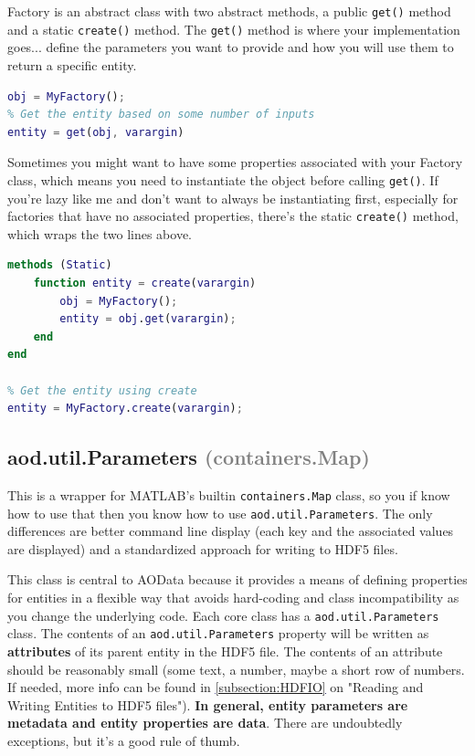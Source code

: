 \documentclass[10pt]{exam}
\newcommand\myurl[1]{\textcolor{blue}{\underline{#1}}}
\newcommand\myparent[1]{\textcolor{gray}{(#1)}}
\newcommand\aodclass[1]{\textcolor{codeblue}{\texttt{#1}}}
\newcommand\aodfcn[1]{\textcolor{darkteal}{\texttt{#1}}}
\begin{document}
		Factory is an abstract class with two abstract methods, a public \aodfcn{get()} method and a static \aodfcn{create()} method. The \aodfcn{get()} method is where your implementation goes... define the parameters you want to provide and how you will use them to return a specific entity. 
		\begin{lstlisting}[language=matlab]
% Instantiate the object
obj = MyFactory();
% Get the entity based on some number of inputs
entity = get(obj, varargin)
		\end{lstlisting}
		Sometimes you might want to have some properties associated with your Factory class, which means you need to instantiate the object before calling \aodfcn{get()}. If you're lazy like me and don't want to always be instantiating first, especially for factories that have no associated properties, there's the static \aodfcn{create()} method, which wraps the two lines above.
		\begin{lstlisting}[language=matlab]
methods (Static)
	function entity = create(varargin)
		obj = MyFactory();
		entity = obj.get(varargin);
	end
end

% Get the entity using create
entity = MyFactory.create(varargin);
		\end{lstlisting}
		
	\subsection{aod.util.Parameters \myparent{containers.Map}}
		\noindent  This is a wrapper for MATLAB's builtin \aodclass{containers.Map} class, so you if know how to use that then you know how to use \aodclass{aod.util.Parameters}. The only differences are better command line display (each key and the associated values are displayed) and a standardized approach for writing to HDF5 files. 
		
		This class is central to AOData because it provides a means of defining properties for entities in a flexible way that avoids hard-coding and class incompatibility as you change the underlying code. 
		Each core class has a \aodclass{aod.util.Parameters} class. The contents of an \aodclass{aod.util.Parameters} property will be written as \textbf{attributes} of its parent entity in the HDF5 file. The contents of an attribute should be reasonably small (some text, a number, maybe a short row of numbers. If needed, more info can be found in \myurl{\ref{subsection:HDFIO}} on "Reading and Writing Entities to HDF5 files").  \textbf{In general, entity parameters are metadata and entity properties are data}. There are undoubtedly exceptions, but it's a good rule of thumb.
		
\end{document}

